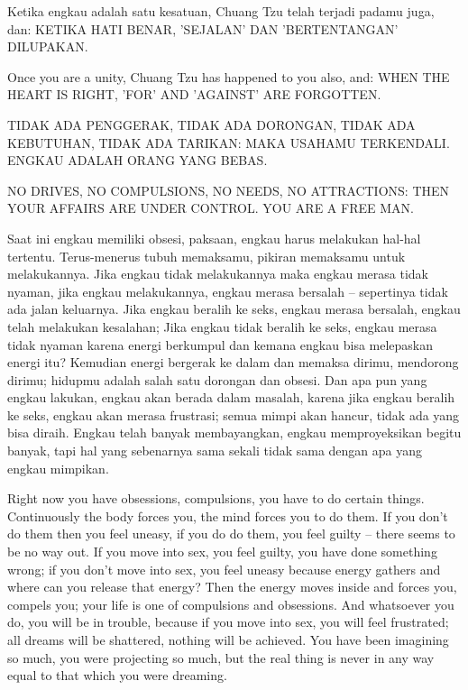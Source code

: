 \bahasa
Ketika engkau adalah satu kesatuan, Chuang Tzu telah terjadi padamu juga, dan: KETIKA HATI BENAR, 'SEJALAN' DAN 'BERTENTANGAN' DILUPAKAN.

\english
Once you are a unity, Chuang Tzu has happened to you also, and: WHEN THE HEART IS RIGHT, 'FOR' AND 'AGAINST' ARE FORGOTTEN.

\bahasa
TIDAK ADA PENGGERAK, TIDAK ADA DORONGAN, TIDAK ADA KEBUTUHAN, TIDAK ADA TARIKAN: MAKA USAHAMU TERKENDALI. ENGKAU ADALAH ORANG YANG BEBAS.

\english
NO DRIVES, NO COMPULSIONS, NO NEEDS, NO ATTRACTIONS: THEN YOUR AFFAIRS ARE UNDER CONTROL. YOU ARE A FREE MAN.

\bahasa
Saat ini engkau memiliki obsesi, paksaan, engkau harus melakukan hal-hal tertentu. Terus-menerus tubuh memaksamu, pikiran memaksamu untuk melakukannya. Jika engkau tidak melakukannya maka engkau merasa tidak nyaman, jika engkau melakukannya, engkau merasa bersalah -- sepertinya tidak ada jalan keluarnya. Jika engkau beralih ke seks, engkau merasa bersalah, engkau telah melakukan kesalahan; Jika engkau tidak beralih ke seks, engkau merasa tidak nyaman karena energi berkumpul dan kemana engkau bisa melepaskan energi itu? Kemudian energi bergerak ke dalam dan memaksa dirimu, mendorong dirimu; hidupmu adalah salah satu dorongan dan obsesi. Dan apa pun yang engkau lakukan, engkau akan berada dalam masalah, karena jika engkau beralih ke seks, engkau akan merasa frustrasi; semua mimpi akan hancur, tidak ada yang bisa diraih. Engkau telah banyak membayangkan, engkau memproyeksikan begitu banyak, tapi hal yang sebenarnya sama sekali tidak sama dengan apa yang engkau mimpikan.

\english
Right now you have obsessions, compulsions, you have to do certain things. Continuously the body forces you, the mind forces you to do them. If you don't do them then you feel uneasy, if you do do them, you feel guilty -- there seems to be no way out. If you move into sex, you feel guilty, you have done something wrong; if you don't move into sex, you feel uneasy because energy gathers and where can you release that energy? Then the energy moves inside and forces you, compels you; your life is one of compulsions and obsessions. And whatsoever you do, you will be in trouble, because if you move into sex, you will feel frustrated; all dreams will be shattered, nothing will be achieved. You have been imagining so much, you were projecting so much, but the real thing is never in any way equal to that which you were dreaming.

